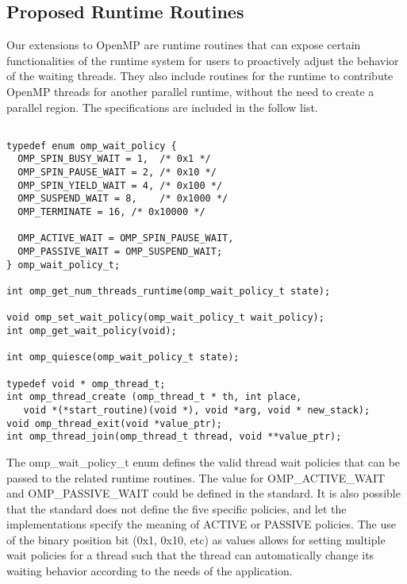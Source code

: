 \subsection{Proposed Runtime Routines} 
Our extensions to OpenMP are runtime routines that can expose 
certain functionalities of the runtime system for users to 
proactively adjust the behavior of the waiting threads.  
They also include routines for the runtime to contribute OpenMP threads for another parallel runtime, without
the need to create a {\sf parallel} region. The specifications are included in the follow list. 

\lstset{basicstyle=\sffamily\footnotesize,language=c, numbersep=1pt}
\begin{lstlisting}[frame=single]  % Start your code-block

typedef enum omp_wait_policy {
  OMP_SPIN_BUSY_WAIT = 1,  /* 0x1 */
  OMP_SPIN_PAUSE_WAIT = 2, /* 0x10 */
  OMP_SPIN_YIELD_WAIT = 4, /* 0x100 */
  OMP_SUSPEND_WAIT = 8,    /* 0x1000 */
  OMP_TERMINATE = 16, /* 0x10000 */

  OMP_ACTIVE_WAIT = OMP_SPIN_PAUSE_WAIT,
  OMP_PASSIVE_WAIT = OMP_SUSPEND_WAIT;
} omp_wait_policy_t; 

int omp_get_num_threads_runtime(omp_wait_policy_t state);

void omp_set_wait_policy(omp_wait_policy_t wait_policy);
int omp_get_wait_policy(void);

int omp_quiesce(omp_wait_policy_t state);

typedef void * omp_thread_t;
int omp_thread_create (omp_thread_t * th, int place,  
   void *(*start_routine)(void *), void *arg, void * new_stack);
void omp_thread_exit(void *value_ptr);
int omp_thread_join(omp_thread_t thread, void **value_ptr);

\end{lstlisting}
The {\sf omp\_wait\_policy\_t} enum defines the valid thread wait policies that can be passed to the 
related runtime routines. The value for {\sf OMP\_ACTIVE\_WAIT} and {\sf OMP\_PASSIVE\_WAIT} could be defined
in the standard. It is also possible that the standard does not define the five specific policies, and let 
the implementations specify the meaning of {\sf ACTIVE} or {\sf PASSIVE} policies. The use of the binary
position bit (0x1, 0x10, etc) as values allows for setting multiple wait policies for a thread such that the thread can automatically change
its waiting behavior according to the needs of the application. 


